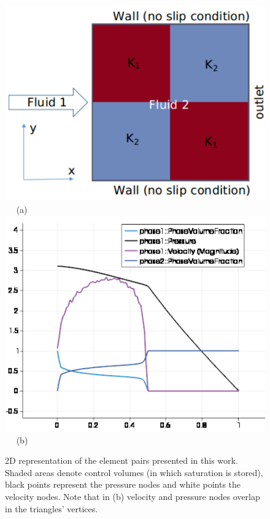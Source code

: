 \begin{figure}[ht] 
\vbox{
\hbox{\hspace{2.5cm}
\includegraphics[width=.6\textwidth]{./Pics/2b2_P1DGP2.pdf} 
}
\vspace{0.0cm}
\hbox{\hspace{5.0cm} (a)  
}
\vspace{0.5cm}
\hbox{\hspace{2.5cm}
\includegraphics[width=.6\textwidth]{./Pics/2b2_P1DGP2_plot.pdf}
}
\vspace{1.0cm}
\hbox{\hspace{5.0cm} (b)  
}}     
\caption{2D representation of the element pairs presented in this work. Shaded areas denote control volumes (in which saturation is stored), black points represent the pressure nodes and white points the velocity nodes. Note that in (b) velocity and pressure nodes overlap in the triangles' vertices.}
\label{fem_cv_represent_a}
\end{figure}


